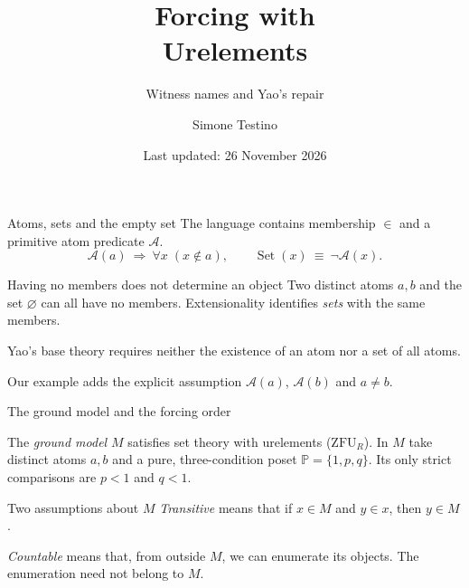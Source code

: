 \documentclass[aspectratio=169,11pt]{beamer}
\title[Forcing with Urelements]{Forcing with\\Urelements}
\subtitle{Witness names and Yao's repair}
\author{Simone Testino}
\date[]{Last updated: 26 November 2026}
\begin{document}
\ACtitleframe

\begin{frame}[t]{Atoms, sets and the empty set}
The language contains membership $\in$ and a primitive atom predicate $\mathcal A$.
\[
\mathcal A(a)\ \Longrightarrow\ \forall x\;(x\notin a),
\qquad \operatorname{Set}(x)\ \equiv\ \neg\mathcal A(x).
\]
\begin{block}{Having no members does not determine an object}
Two distinct atoms $a,b$ and the set $\varnothing$ can all have no members.
Extensionality identifies \emph{sets} with the same members.
\end{block}
Yao's base theory requires neither the existence of an atom nor a set of all atoms.
\medskip\par
Our example adds the explicit assumption $\mathcal A(a)$, $\mathcal A(b)$ and $a\ne b$.
\end{frame}

\begin{frame}[t]{The ground model and the forcing order}
\begin{ACcolumns}
\ACdiagramcolumn
\centering{}
\ACtextcolumn
The \emph{ground model} $M$ satisfies set theory with urelements ($\mathrm{ZFU}_{R}$). In $M$ take distinct atoms $a,b$ and a pure, three-condition poset $\mathbb P=\{1,p,q\}$. Its only strict comparisons are $p<1$ and $q<1$.
\end{ACcolumns}
\begin{block}{Two assumptions about $M$}
\emph{Transitive} means that if $x\in M$ and $y\in x$, then $y\in M$.\par
\emph{Countable} means that, from outside $M$, we can enumerate its objects. The enumeration need not belong to $M$.
\end{block}
\end{frame}
\end{document}
